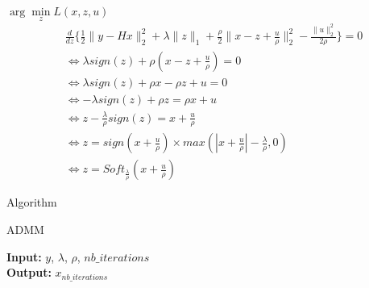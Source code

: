 \begin{frame}{$\arg\min\limits_{z} {L(x, z, u)}$}
\begin{align*}
&\frac{d}{dz} \{
    \frac{1}{2} \lVert y - Hx \rVert_{2}^{2} 
    + \lambda \lVert z \rVert_{1} 
    + \frac{\rho}{2} \lVert x - z + \frac{u}{\rho} \rVert_{2}^{2} 
    - \frac{\lVert u \rVert_{2}^{2}}{2\rho}
\} = 0 \\
&\iff \lambda sign(z) + \rho (x - z + \frac{u}{\rho})  = 0 \\
&\iff \lambda sign(z) + \rho x - \rho z + u  = 0 \\
&\iff -\lambda sign(z) + \rho z  = \rho x + u \\
&\iff  z - \frac{\lambda}{\rho} sign(z) = x + \frac{u}{\rho} \\
&\iff  z = sign(x + \frac{u}{\rho}) 
\times max(|x + \frac{u}{\rho}| 
- \frac{\lambda}{\rho}, 0) \\
&\iff  z = Soft_{\frac{\lambda}{\rho}}(x + \frac{u}{\rho})
\end{align*}
\end{frame}

\begin{frame}{Algorithm}
\begin{algorithm}[H]
    \caption{ADMM} %
    \begin{algorithmic}[1]
        \newline
        \textbf{Input:} $y$, $\lambda$, $\rho$, $nb\_iterations$ \\
        \textbf{Output:} $x_{nb\_iterations}$
        \EndFor
        \EndProcedure
    \end{algorithmic}
\end{algorithm}
\end{frame}

